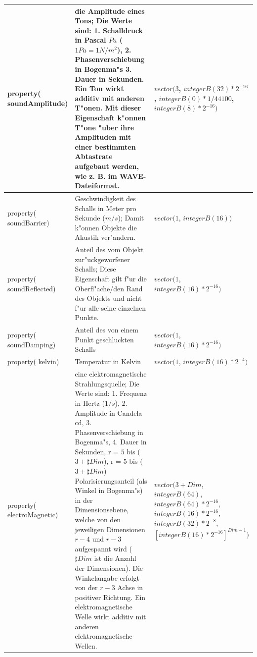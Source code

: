 \begin{small}
\begin{center}
\begin{longtable}{|p{18mm}|p{65mm}|p{35mm}|}
	property( soundAmplitude) & die Amplitude eines Tons; Die Werte sind: 1. Schalldruck in Pascal $Pa$ ($1 Pa= 1 N/m^2$), 2. Phasenverschiebung in Bogenma"s 3. Dauer in Sekunden. Ein Ton wirkt additiv mit anderen T"onen. Mit dieser Eigenschaft k"onnen T"one "uber ihre Amplituden mit einer bestimmten Abtastrate aufgebaut werden, wie z. B. im WAVE-Dateiformat. & $vector( 3$, $integerB(32)*2^{-16}$,  $integerB(0) * 1/44100$, $integerB(8) * 2^{-16}  )$ \\\hline

	property( soundBarrier) & Geschwindigkeit des Schalls in Meter pro Sekunde ($m/s$); Damit k"onnen Objekte die Akustik ver"andern. & $vector( 1$, $integerB(16) )$ \\\hline
	property( soundReflected) & Anteil des vom Objekt zur"uckgeworfener Schalls; Diese Eigenschaft gilt f"ur die Oberfl"ache/den Rand des Objekts und nicht f"ur alle seine einzelnen Punkte. & $vector( 1$, $integerB(16) * 2^{-16} )$ \\\hline
	property( soundDamping) & Anteil des von einem Punkt geschluckten Schalls & $vector( 1$, $integerB(16) * 2^{-16} )$  \\\hline

	property( kelvin) & Temperatur in Kelvin & $vector( 1$, $integerB(16) * 2^{-4} )$ \\\hline
	property( electroMagnetic) & eine elektromagnetische Strahlungsquelle; Die Werte sind: 1. Frequenz in Hertz ($1/s$), 2. Amplitude in Candela cd, 3. Phasenverschiebung in Bogenma"s, 4. Dauer in Sekunden, r = $5$ bis ($3 + \sharp Dim$),  r = $5$ bis ($3 + \sharp Dim$) Polarisierungsanteil (als Winkel in Bogenma"s) in der Dimensionsebene, welche von den jeweiligen Dimensionen $r-4$ und $r-3$ aufgespannt wird ($\sharp Dim$ ist die Anzahl der Dimensionen). Die Winkelangabe erfolgt von der $r-3$ Achse in positiver Richtung. Ein elektromagnetische Welle wirkt additiv mit anderen elektromagnetische Wellen. & $vector( 3 + Dim$, $integerB(64)$, $integerB(64) * 2^{-16}$, $integerB(16) * 2^{-16}$, $integerB(32) * 2^{-8},$ $[integerB(16) * 2^{-16}]^{Dim-1}  )$ \\\hline


\end{longtable}
\end{center}
\end{small}
